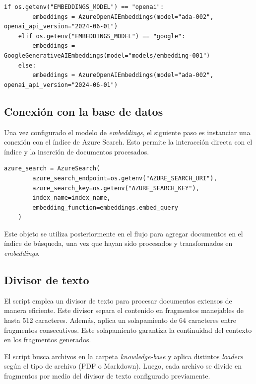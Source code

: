 \begin{lstlisting}[label=cod:update-db-3,caption=Configuración del modelo de \textit{embeddings}.]
	if os.getenv("EMBEDDINGS_MODEL") == "openai":
		embeddings = AzureOpenAIEmbeddings(model="ada-002", openai_api_version="2024-06-01")
	elif os.getenv("EMBEDDINGS_MODEL") == "google":    
		embeddings = GoogleGenerativeAIEmbeddings(model="models/embedding-001")
	else:
		embeddings = AzureOpenAIEmbeddings(model="ada-002", openai_api_version="2024-06-01")
\end{lstlisting}

\subsection{Conexión con la base de datos}

Una vez configurado el modelo de \textit{embeddings}, el siguiente paso es instanciar una conexión con el índice de Azure Search. 
Esto permite la interacción directa con el índice y la inserción de documentos procesados.

\begin{lstlisting}[label=cod:update-db-4,caption=Conexión con la base de datos.]
	azure_search = AzureSearch(
		azure_search_endpoint=os.getenv("AZURE_SEARCH_URI"),
		azure_search_key=os.getenv("AZURE_SEARCH_KEY"),
		index_name=index_name,
		embedding_function=embeddings.embed_query
	)
\end{lstlisting}

Este objeto se utiliza posteriormente en el flujo para agregar documentos en el índice de búsqueda, una vez que hayan sido procesados y transformados en \textit{embeddings}.

\subsection{Divisor de texto}

El script emplea un divisor de texto para procesar documentos extensos de manera eficiente. Este divisor separa el contenido en 
fragmentos manejables de hasta 512 caracteres. Además, aplica un solapamiento de 64 caracteres entre fragmentos consecutivos. Este 
solapamiento garantiza la continuidad del contexto en los fragmentos generados.

El script busca archivos en la carpeta \textit{knowledge-base} y aplica distintos \textit{loaders} según el tipo de archivo (PDF o Markdown). Luego, 
cada archivo se divide en fragmentos por medio del divisor de texto configurado previamente.

